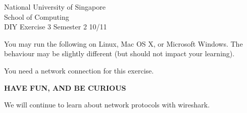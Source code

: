 \documentclass[a4paper,11pt]{exam}
\begin{document}
\extraheadheight{.5in}
%
{\large\sf National University of Singapore\\ School of Computing \\
\LARGE\sf DIY Exercise 3}%
{\large\sf Semester 2 10/11}
\firstpageheadrule
\pagestyle{headandfoot}

You may run the following on Linux, Mac OS X, or Microsoft Windows.  The behaviour may be slightly different (but should not impact your learning).

You need a network connection for this exercise.  

\begin{center}
	\textbf\textsf{HAVE FUN, AND BE CURIOUS}
\end{center}

We will continue to learn about network protocols with wireshark. 
\end{document}

